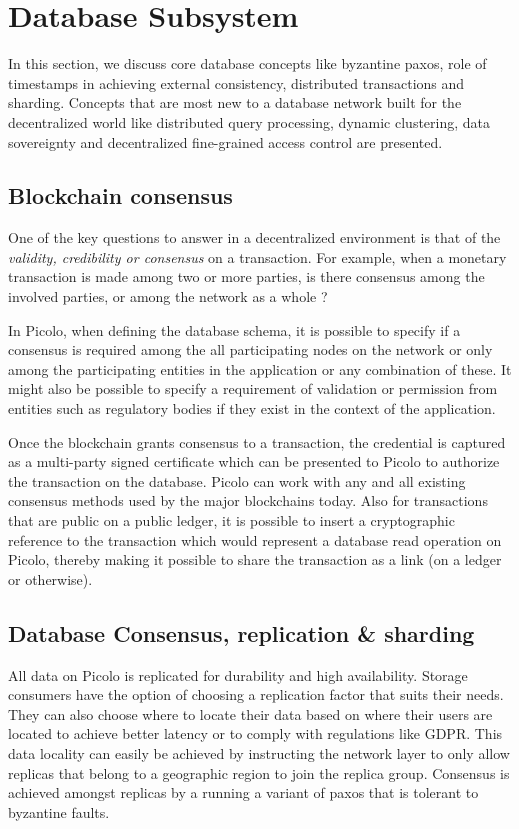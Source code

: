 \section{Database Subsystem}
In this section, we discuss core database concepts like byzantine paxos, role of timestamps in achieving external consistency, distributed transactions and sharding. Concepts that are most new to a database network built for the  decentralized world like distributed query processing, dynamic clustering, data sovereignty and decentralized fine-grained access control are presented.

\subsection{Blockchain consensus}

One of the key questions to answer in a decentralized environment is that of the {\em validity, credibility or
consensus} on a transaction. For example, when a monetary transaction is made among two or more parties, is there consensus among the
involved parties, or among the network as a whole ?

In Picolo, when defining the database schema, it is possible to specify if a consensus is required among the all
participating nodes on the network or only among the participating entities in the application or any combination of
these. It might also be possible to specify a requirement of validation or permission from entities such as regulatory
bodies if they exist in the context of the application.

Once the blockchain grants consensus to a transaction, the credential is captured as a multi-party signed certificate
which can be presented to Picolo to authorize the transaction on the database. Picolo can work with any and all existing
consensus methods used by the major blockchains today. Also for transactions that are public on a public ledger, it
is possible to insert a cryptographic reference to the transaction which would represent a database read operation on
Picolo, thereby making it possible to share the transaction as a link (on a ledger or otherwise).

\subsection{Database Consensus, replication \& sharding} \label{sec:paxos}
All data on \textsf{Picolo} is replicated for durability and high availability. Storage consumers have the option of choosing a replication factor that suits their needs. They can also choose where to locate their data based on where their users are located to achieve better latency or to comply with regulations like GDPR. This data locality can easily be achieved by instructing the network layer to only allow replicas that belong to a geographic region to join the replica group. Consensus is achieved amongst replicas by a running a variant of paxos that is tolerant to byzantine faults.
